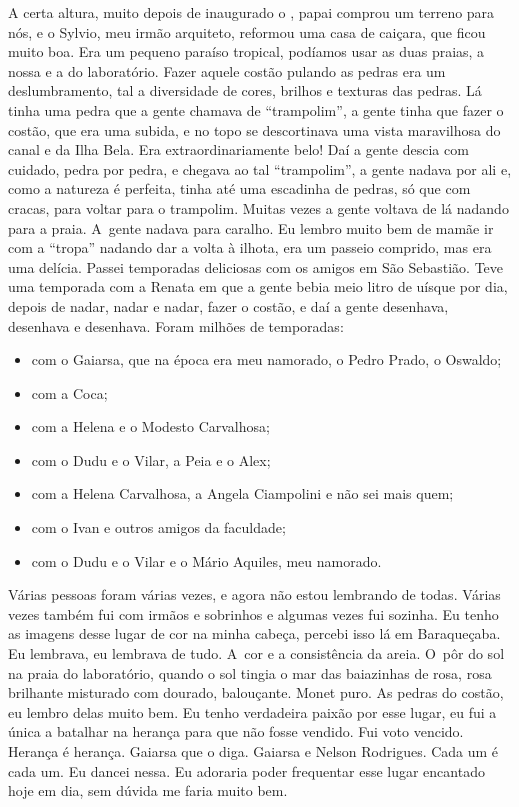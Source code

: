 A certa altura, muito depois de inaugurado o , papai comprou um
terreno para nós, e o Sylvio, meu irmão arquiteto, reformou uma casa de
caiçara, que ficou muito boa. Era um pequeno paraíso tropical, podíamos
usar as duas praias, a nossa e a do laboratório. Fazer aquele costão
pulando as pedras era um deslumbramento, tal a diversidade de cores,
brilhos e texturas das pedras. Lá tinha uma pedra que a gente chamava de
``trampolim'', a gente tinha que fazer o costão, que era uma subida, e
no topo se descortinava uma vista maravilhosa do canal e da Ilha Bela.
Era extraordinariamente belo! Daí a gente descia com cuidado, pedra por
pedra, e chegava ao tal ``trampolim'', a gente nadava por ali e, como a
natureza é perfeita, tinha até uma escadinha de pedras, só que com
cracas, para voltar para o trampolim. Muitas vezes a gente voltava de lá
nadando para a praia. A~gente nadava para caralho. Eu lembro muito bem
de mamãe ir com a ``tropa'' nadando dar a volta à ilhota, era um passeio
comprido, mas era uma delícia. Passei temporadas deliciosas com os
amigos em São Sebastião. Teve uma temporada com a Renata em que a gente
bebia meio litro de uísque por dia, depois de nadar, nadar e nadar,
fazer o costão, e daí a gente desenhava, desenhava e desenhava. Foram
milhões de temporadas:

\begin{itemize}
\item
  com o Gaiarsa, que na época era meu namorado, o Pedro Prado, o
  Oswaldo;
\item
  com a Coca;
\item
  com a Helena e o Modesto Carvalhosa;
\item
  com o Dudu e o Vilar, a Peia e o Alex;
\item
  com a Helena Carvalhosa, a Angela Ciampolini e não sei mais quem;
\item
  com o Ivan e outros amigos da faculdade;
\item
  com o Dudu e o Vilar e o Mário Aquiles, meu namorado.
\end{itemize}
Várias pessoas foram várias vezes, e agora não estou lembrando de todas.
Várias vezes também fui com irmãos e sobrinhos e algumas vezes fui
sozinha. Eu tenho as imagens desse lugar de cor na minha cabeça, percebi
isso lá em Baraqueçaba. Eu lembrava, eu lembrava de tudo. A~cor e a
consistência da areia. O~pôr do sol na praia do laboratório, quando o
sol tingia o mar das baiazinhas de rosa, rosa brilhante misturado com
dourado, balouçante. Monet puro. As pedras do costão, eu lembro delas
muito bem. Eu tenho verdadeira paixão por esse lugar, eu fui a única a
batalhar na herança para que não fosse vendido. Fui voto vencido.
Herança é herança. Gaiarsa que o diga. Gaiarsa e Nelson Rodrigues. Cada
um é cada um. Eu dancei nessa. Eu adoraria poder frequentar esse lugar
encantado hoje em dia, sem dúvida me faria muito bem.

